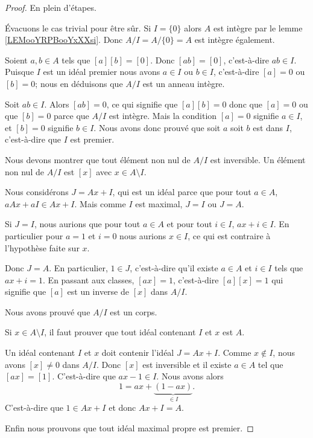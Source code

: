 \begin{proof}
	En plein d'étapes.
	\begin{subproof}
		\spitem[\ref{ITEMooUGBTooOGrnWl}, \( \Rightarrow\)]
		Évacuons le cas trivial pour être sûr. Si \( I=\{ 0 \}\) alors \( A\) est intègre par le lemme \ref{LEMooYRPBooYxXXsi}. Donc \( A/I=A/\{ 0 \}=A\) est intègre également.

		Soient \( a,b\in A\) tels que \( [a][b]=[0]\). Donc \( [ab]=[0]\), c'est-à-dire \( ab\in I\). Puisque \( I\) est un idéal premier nous avons \( a\in I\) ou \( b\in I\), c'est-à-dire \( [a]=0\) ou \( [b]=0\); nous en déduisons que \( A/I\) est un anneau intègre.
		\spitem[\ref{ITEMooUGBTooOGrnWl}, \( \Leftarrow\)]

		Soit \( ab\in I\). Alors \( [ab]=0\), ce qui signifie que \( [a][b]=0\) donc que \( [a]=0\) ou que \( [b]=0\) parce que \( A/I\) est intègre. Mais la condition \( [a]=0\) signifie \( a\in I\), et \( [b]=0\) signifie \( b\in I\). Nous avons donc prouvé que soit \( a\) soit \( b\) est dans \( I\), c'est-à-dire que \( I\) est premier.
		\spitem[\ref{ITEMooGLXSooUjINqR}, \( \Rightarrow\)]

		Nous devons montrer que tout élément non nul de \( A/I\) est inversible. Un élément non nul de \( A/I\) est \( [x]\) avec \( x\in A\setminus I\).

		Nous considérons \( J=Ax+I\), qui est un idéal parce que pour tout \( a\in A\), \( aAx+aI\in Ax+I\). Mais comme \( I\) est maximal, \( J=I\) ou \( J=A\).

		Si \( J=I\), nous aurions que pour tout \( a\in A\) et pour tout \( i\in I\), \( ax+i\in I\). En particulier pour \( a=1\) et \( i=0\) nous aurions \( x\in I\), ce qui est contraire à l'hypothèse faite sur \( x\).

		Donc \( J=A\). En particulier, \( 1\in J\), c'est-à-dire qu'il existe \( a\in A\) et \( i\in I\) tels que \( ax+i=1\). En passant aux classes, \( [ax]=1\), c'est-à-dire \( [a][x]=1\) qui signifie que \( [a]\) est un inverse de \( [x]\) dans \( A/I\).

		Nous avons prouvé que \( A/I\) est un corps.

		\spitem[\ref{ITEMooGLXSooUjINqR}, \( \Leftarrow\)]
		Si \( x\in A\setminus I\), il faut prouver que tout idéal contenant \( I\) et \( x\) est \( A\).

		Un idéal contenant \( I\) et \( x\) doit contenir l'idéal \( J=Ax+I\). Comme \( x\notin I\), nous avons \( [x]\neq 0\) dans \( A/I\). Donc \( [x] \) est inversible et il existe \( a\in A\) tel que \( [ax]=[1]\). C'est-à-dire que \( ax-1\in I\). Nous avons alors
		\begin{equation}
			1=ax+\underbrace{(1-ax)}_{\in I}.
		\end{equation}
		C'est-à-dire que \( 1\in Ax+I\) et donc \( Ax+I=A\).
	\end{subproof}
	Enfin nous prouvons que tout idéal maximal propre est premier.


\end{proof}
